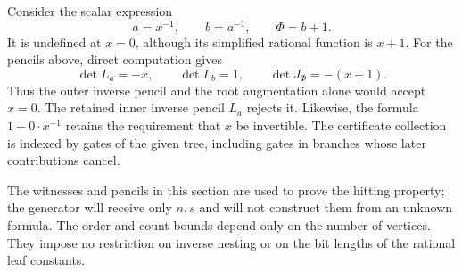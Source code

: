 \begin{remark}
Consider the scalar expression
\[
 a=x^{-1},\qquad b=a^{-1},\qquad \Phi=b+1.
\]
It is undefined at $x=0$, although its simplified rational function is
$x+1$.  For the pencils above, direct computation gives
\[
 \det L_a=-x,\qquad \det L_b=1,\qquad \det J_\Phi=-(x+1).
\]
Thus the outer inverse pencil and the root augmentation alone would
accept $x=0$.  The retained inner inverse pencil $L_a$ rejects it.
Likewise, the formula $1+0\cdot x^{-1}$ retains the requirement that
$x$ be invertible.  The certificate collection is indexed by gates of
the given tree, including gates in branches whose later contributions
cancel.
\end{remark}

The witnesses and pencils in this section are used to prove the hitting
property; the generator will receive only $n,s$ and will not construct
them from an unknown formula.  The order and count bounds depend only
on the number of vertices.  They impose no restriction on inverse
nesting or on the bit lengths of the rational leaf constants.

